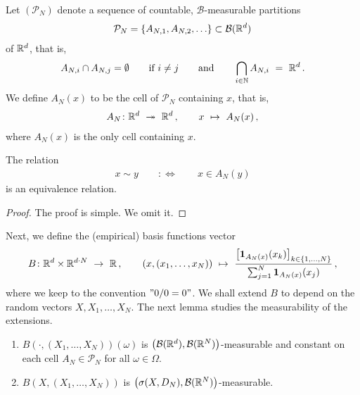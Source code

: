 Let $
\left(
\mathcal{P}_N
\right)
$
denote a sequence of countable, $\mathcal{B}$-measurable partitions 
\begin{align*}
\mathcal{P}_N= \left\{
  A_{N,1},
  A_{N,2},
  \ldots
\right\}
\subset \mathcal{B}(\mathbb{R}^d)
\end{align*}
of $\mathbb{R}^d$, that is, 
\begin{align*}
  A_{N,i}\cap A_{N,j}=\emptyset
  \qquad
  \text{if}\ i\neq j
  \qquad
  \text{and}
  \qquad 
  \bigcap_{i\in\mathbb{N}}A_{N,i}
  \ 
  =
  \ 
  \R^d
  \,.
\end{align*}
We define
$ A_N(x) $ to be the cell of $ \mathcal{P}_N $ containing $x$, that is,
\begin{align*}
  A_N
  \colon
  \R^d 
  \ 
  \twoheadrightarrow 
  \ 
  \R^d  
  \,,\qquad
  x
  \ 
  \mapsto
  \ 
  A_N(x)
  \,,
\end{align*}
where $A_N(x)$ is the only cell containing $x$. 

\begin{lemma}
  \label{lem:basis_equiv_r}
  The relation
  \begin{align*}
    x\sim y
    \qquad
    :\Leftrightarrow
    \qquad
    x\in A_N(y)
  \end{align*}
  is an equivalence relation.
\end{lemma}
\begin{proof}
  The proof is simple. We omit it.
\end{proof}
Next, we define the (empirical) basis functions vector
\begin{align}
  \label{def:basis}
  B\colon
  \R^d\times \R^{d\cdot N}
  \ 
  \to
  \ 
  \R
  \,,
  \qquad
  (x,(x_1,\ldots,x_N))
  \ 
  \mapsto
  \ 
  \frac
  {
    \left[
    \mathbf{1}
    _{
      A_N(x)
    }
    (x_k)
    \right]
    _{k\in \left\{
        1,\ldots,N
    \right\}}
  }
  {
    \sum_{j=1}^N
    \mathbf{1}
    _{
      A_N(x)
    }
    (x_j)
    }
  \,,
\end{align}
where we keep to the convention $"0/0=0"$.
We shall extend $B$ to depend on the random vectors
$X,X_1,\ldots,X_N$.
The next lemma studies the measurability of the extensions.
\begin{lemma}
  \label{lem:basis_meas}
  \quad
  \begin{enumerate}[label=(\roman*)]
\item
  $B(\cdot,(X_1,\ldots,X_N))(\omega)$ is 
  $\left(
    \mathcal{B}(\mathbb{R}^d),\mathcal{B}(\mathbb{R}^N)
  \right)$-measurable
  and
  constant on each cell 
  $A_N\in\mathcal{P}_N$
  for all $\omega\in\Omega$. 
\item
  $B(X,(X_1,\ldots,X_N))$ is $\left(
    \sigma(X,D_N),\mathcal{B}(\mathbb{R}^N)
  \right)$-measurable. 
  \end{enumerate}
\end{lemma}

